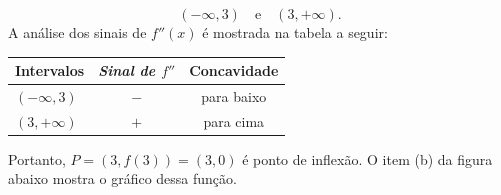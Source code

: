 \cleardoublepage\documentclass[../main.tex]{subfiles}
\begin{document}
\begin{compactenum}[a)]
\begin{solution}
\begin{compactenum}[i.]
\[ (-\infty, 3)\quad \mbox{e} \quad \left(3,+\infty\right). \]
A análise dos sinais de \(f''(x)\) é mostrada na tabela a seguir:
\begin{center}
  \begin{tabular}{l|c|c}
  \toprule
    \textbf{Intervalos} &	\emph{Sinal de \(f''\)} &	\textbf{Concavidade}\\\hline
 \((-\infty, 3)\) &\(-\)&para baixo\\\hline
   \((3,+\infty)\) & \(+\) & para cima\\
    \bottomrule
  \end{tabular}
  \end{center}
\end{compactenum}
Portanto, \(P=(3,f(3))=(3,0)\) é ponto de inflexão. O item (b) da figura abaixo mostra o gráfico dessa função.
\end{solution}
\begin{figure}[H]
    \centering
    \hfill
{}\hfill
{}\hfill
\end{figure}


\end{compactenum}
\end{document}
